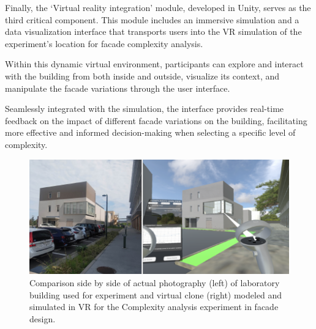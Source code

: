 
Finally, the `Virtual reality integration' module, developed in Unity, serves as the third critical component.
This module includes an immersive simulation and a data visualization interface that transports users into the VR simulation of the experiment's location for facade complexity analysis.

Within this dynamic virtual environment, participants can explore and interact with the building from both inside and outside, visualize its context, and manipulate the facade variations through the user interface.

Seamlessly integrated with the simulation, the interface provides real-time feedback on the impact of different facade variations on the building, facilitating more effective and informed decision-making when selecting a specific level of complexity.

     \begin{figure}[t]
          \centering
          \includegraphics[width= \linewidth]{Images/RealvsVRBuildling}
          \caption{Comparison side by side of actual photography (left) of laboratory building used for experiment and virtual clone (right) modeled and simulated in VR for the Complexity analysis experiment in facade design.}
          \label{fig:RealVsVR}
        \end{figure}

